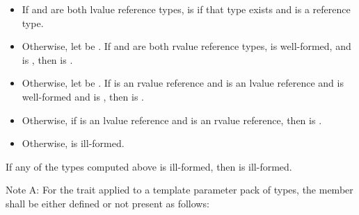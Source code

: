 \begin{itemize}
\item If  and  are both lvalue reference types,
   is
   if that type exists
  and is a reference type.
\item Otherwise, let  be
  .
  If  and  are both rvalue reference types,
   is well-formed, and
   is ,
  then  is .
\item Otherwise, let  be
  . If  is an rvalue
  reference and  is an lvalue reference and  is
  well-formed and  is
  , then  is .
\item Otherwise, if  is an lvalue reference and 
  is an rvalue reference, then  is
  .
\item Otherwise,  is ill-formed.
\end{itemize}

If any of the types computed above is ill-formed, then
 is ill-formed.

\pnum
Note A:
For the  trait applied to a template parameter pack  of types,
the member  shall be either defined or not present as follows:

